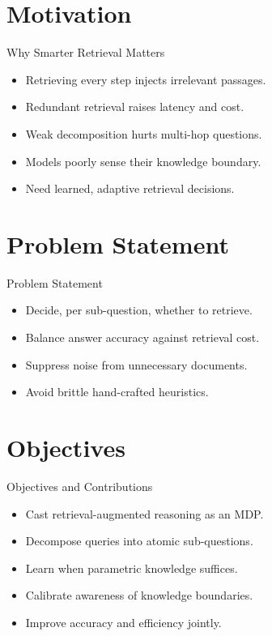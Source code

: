 \documentclass{beamer}
\begin{document}
\section{Motivation}
\begin{frame}{Why Smarter Retrieval Matters}
\begin{itemize}
\item Retrieving every step injects irrelevant passages.
\item Redundant retrieval raises latency and cost.
\item Weak decomposition hurts multi-hop questions.
\item Models poorly sense their knowledge boundary.
\item Need learned, adaptive retrieval decisions.
\end{itemize}
\end{frame}

\section{Problem Statement}
\begin{frame}{Problem Statement}
\begin{itemize}
\item Decide, per sub-question, whether to retrieve.
\item Balance answer accuracy against retrieval cost.
\item Suppress noise from unnecessary documents.
\item Avoid brittle hand-crafted heuristics.
\end{itemize}
\end{frame}

\section{Objectives}
\begin{frame}{Objectives and Contributions}
\begin{itemize}
\item Cast retrieval-augmented reasoning as an MDP.
\item Decompose queries into atomic sub-questions.
\item Learn when parametric knowledge suffices.
\item Calibrate awareness of knowledge boundaries.
\item Improve accuracy and efficiency jointly.
\end{itemize}
\end{frame}
\end{document}
